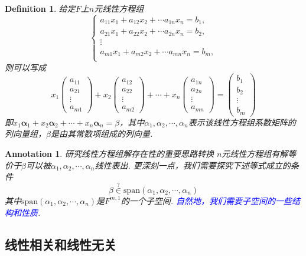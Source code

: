 \documentclass{article}
\newtheorem{definition}[theorem]{Definition}
\newtheorem{annotation}[theorem]{Annotation}
\newcommand{\mbf}[1]{\bm{#1}}
\newcommand{\bluet}[1]{\textcolor{blue}{#1}}
\begin{document}
\begin{definition}
\rm 给定$F$上$n$元线性方程组
$$
\left\{
\begin{array}{c}
a_{11}x_1 + a_{12}x_2 + \cdots a_{1n}x_n = b_1, \\
a_{21}x_1 + a_{22}x_2 + \cdots a_{2n}x_n = b_2, \\
\vdots \\
a_{m1}x_1 + a_{m2}x_2 + \cdots a_{mn}x_n = b_m, \\
\end{array} \right.
$$
则可以写成
$$
x_1 \begin{pmatrix}
a_{11} \\
a_{21} \\
\vdots \\
a_{m1} 
\end{pmatrix} + 
x_2 \begin{pmatrix}
a_{12} \\
a_{22} \\
\vdots \\
a_{m2} 
\end{pmatrix} +
\cdots +
x_n \begin{pmatrix}
a_{1n} \\
a_{2n} \\
\vdots \\
a_{mn}  
\end{pmatrix} = 
\begin{pmatrix}
b_1 \\
b_2 \\
\vdots \\
b_m  
\end{pmatrix} 
$$
即$x_1\mbf{\alpha}_1 + x_2\mbf{\alpha}_2 + \cdots + x_n\mbf{\alpha}_n = \beta $，其中${\alpha}_1,{\alpha}_2,\cdots,{\alpha}_n$表示该线性方程组系数矩阵的列向量组，$\beta$是由其常数项组成的列向量.
\end{definition}

\begin{annotation}
\rm {\color{red} 研究线性方程组解存在性的重要思路转换} $n$元线性方程组有解等价于$\beta$可以被${\alpha}_1,{\alpha}_2,\cdots,{\alpha}_n$线性表出. 更深刻一点，我们需要探究下述等式成立的条件
$$
\beta \overset{?}{\in} \text{span}({\alpha}_1,{\alpha}_2,\cdots,{\alpha}_n) 
$$
其中$\text{span}({\alpha}_1,{\alpha}_2,\cdots,{\alpha}_n)$是$F^{m,1}$的一个子空间. \bluet{自然地，我们需要子空间的一些结构和性质}.
\end{annotation}

\subsection{线性相关和线性无关}
\end{document}
